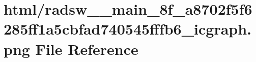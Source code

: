 \hypertarget{radsw____main__8f__a8702f5f6285ff1a5cbfad740545fffb6__icgraph_8png}{}\section{html/radsw\+\_\+\+\_\+main\+\_\+8f\+\_\+a8702f5f6285ff1a5cbfad740545fffb6\+\_\+icgraph.png File Reference}
\label{radsw____main__8f__a8702f5f6285ff1a5cbfad740545fffb6__icgraph_8png}

